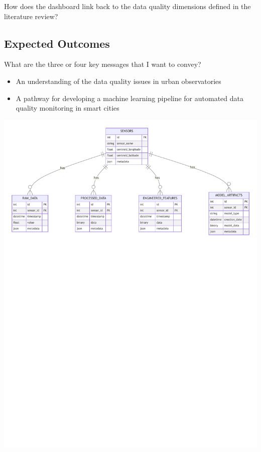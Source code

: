 How does the dashboard link back to the data quality dimensions defined in the literature review?

\subsection{Expected Outcomes}

What are the three or four key messages that I want to convey?
\begin{itemize}
    \item An understanding of the data quality issues in urban observatories
    \item A pathway for developing a machine learning pipeline for automated data quality monitoring in smart cities
\end{itemize}

\includegraphics[width=\textwidth]{mermaid/database.pdf}
